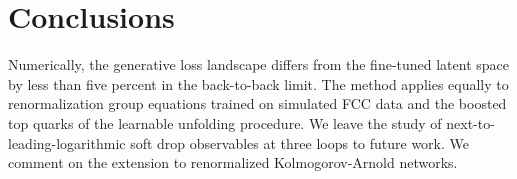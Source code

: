 \section{Conclusions}\label{sec:conclusions}

Numerically, the generative loss landscape differs from the fine-tuned
latent space by less than five percent in the back-to-back limit. The
method applies equally to renormalization group equations trained on
simulated FCC data and the boosted top quarks of the learnable unfolding
procedure. We leave the study of next-to-leading-logarithmic soft drop
observables at three loops to future work. We comment on the extension
to renormalized Kolmogorov-Arnold networks.


